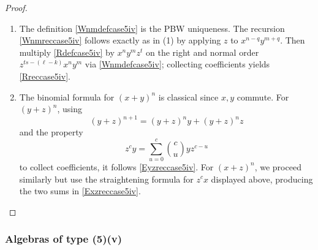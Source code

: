 \documentclass{amsart}
\theoremstyle{definition}
\theoremstyle{remark}
\numberwithin{equation}{section}
\begin{document}
\begin{proof}
\begin{enumerate}
\item [\rm (4)] The definition \eqref{Wnmdefcase5iv} is the PBW uniqueness. The recursion \eqref{Wnmreccase5iv} follows exactly as in \textup{(1)} by applying $z$ to $x^{n-q}y^{m+q}$.
Then multiply \eqref{Rdefcase5iv} by $x^n y^m z^t$ on the right and normal order $z^{ts-(\ell-k)}x^n y^m$ via \eqref{Wnmdefcase5iv}; collecting coefficients yields \eqref{Rreccase5iv}.

\item [\rm (5)] The binomial formula for $(x+y)^n$ is classical since $x,y$ commute. For $(y + z)^n$, using 
$$
(y+z)^{n+1} = (y+z)^n y+(y+z)^n z
$$ 
and the property
$$
z^{c}y = \sum_{u=0}^{c}\binom{c}{u}yz^{c-u}
$$ 
to collect coefficients, it follows \eqref{Eyzreccase5iv}.
For $(x+z)^n$, we proceed similarly but use the straightening formula for $z^{c}x$ displayed above, producing the two sums in \eqref{Exzreccase5iv}.
\end{enumerate}
\end{proof}


\subsubsection{Algebras of type (5)(v)}
\end{document}

